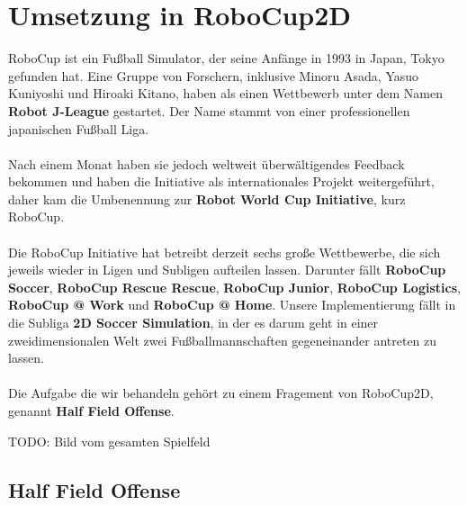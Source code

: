 \chapter{Umsetzung in RoboCup2D}
    RoboCup ist ein Fußball Simulator, der seine Anfänge in 1993 in Japan, Tokyo gefunden hat. Eine Gruppe von Forschern, inklusive Minoru Asada, Yasuo Kuniyoshi und Hiroaki Kitano, haben als einen Wettbewerb unter dem Namen \textbf{Robot J-League} gestartet. Der Name stammt von einer professionellen japanischen Fußball Liga.\\
    \\
    Nach einem Monat haben sie jedoch weltweit überwältigendes Feedback bekommen und haben die Initiative als internationales Projekt weitergeführt, daher kam die Umbenennung zur \textbf{Robot World Cup Initiative}, kurz RoboCup. \\
    \\
    Die RoboCup Initiative hat betreibt derzeit sechs große Wettbewerbe, die sich jeweils wieder in Ligen und Subligen aufteilen lassen.
    Darunter fällt \textbf{RoboCup Soccer}, \textbf{RoboCup Rescue Rescue}, \textbf{RoboCup Junior}, \textbf{RoboCup Logistics}, \textbf{RoboCup @ Work} und \textbf{RoboCup @ Home}. Unsere Implementierung fällt in die Subliga \textbf{2D Soccer Simulation}, in der es darum geht in einer zweidimensionalen Welt zwei Fußballmannschaften gegeneinander antreten zu lassen.\\
    \\
    Die Aufgabe die wir behandeln gehört zu einem Fragement von RoboCup2D, genannt \textbf{Half Field Offense}.

    TODO: Bild vom gesamten Spielfeld

    \section{Half Field Offense}

